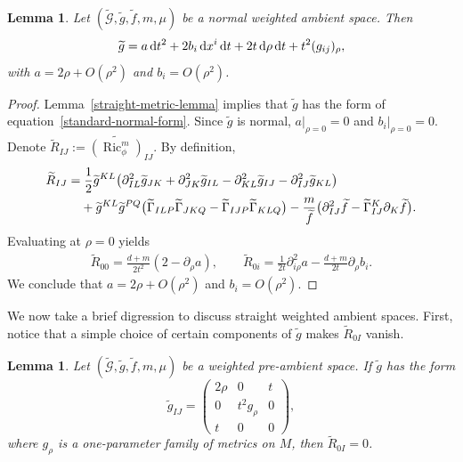 \documentclass[pdftex]{sigma}
\DeclareMathOperator{\Ric}{Ric}
\newcommand{\ric}{\Ric_{\phi}^m}
\numberwithin{equation}{section}
\newtheorem{Lemma}[Theorem]{Lemma}
\begin{document}
\begin{Lemma}\label{ambient-metric-base-case}
Let $(\widetilde{\mathcal{G}},\widetilde{g},\widetilde{f},m,\mu)$ be a normal weighted ambient space. Then \begin{equation}\label{standard-normal-form}\widetilde{g}=a\,\mathrm{d}t^2+2b_i\, {\rm d}x^i \,\mathrm{d}t+ 2t\,{\rm d}\rho\, \mathrm{d}t+ t^2 (g_{ij})_\rho,\end{equation} with $a=2\rho+O(\rho^2)$ and $b_i=O(\rho^2)$.
\end{Lemma}

\begin{proof}
Lemma~\ref{straight-metric-lemma} implies that $\widetilde{g}$ has the form of equation~\eqref{standard-normal-form}. Since $\widetilde{g}$ is normal, $a|_{\rho=0}=0$ and $b_i|_{\rho=0}=0$. Denote $\widetilde{R}_{IJ}:=\widetilde{(\ric)}_{IJ}$.
By definition,
\begin{gather*}
\begin{split}
&\widetilde{R}_{IJ}=\frac{1}{2}\widetilde{g}^{KL}\big(\partial^2_{IL}\widetilde{g}_{JK} +\partial^2_{JK}\widetilde{g}_{IL}-\partial^2_{KL}\widetilde{g}_{IJ}-\partial^2_{IJ}\widetilde{g}_{KL}\big)
\\ &\hphantom{\widetilde{R}_{IJ}=}
{}+\widetilde{g}^{KL}\widetilde{g}^{PQ}\big(\widetilde{\Gamma}_{ILP}\widetilde{\Gamma}_{JKQ} -\widetilde{\Gamma}_{IJP}\widetilde{\Gamma}_{KLQ}\big)
-\frac{m}{\widetilde{f}}\big(\partial^2_{IJ}\widetilde{f} -\widetilde{\Gamma}^K_{IJ}\partial_K\widetilde{f}\big).
\end{split}
\end{gather*}
Evaluating at $\rho=0$ yields
\begin{gather*}
\widetilde{R}_{00}= \frac{d+m}{2t^2}(2-\partial_{\rho}a),
\qquad
\widetilde{R}_{0i}=\frac{1}{2t}\partial^2_{i\rho}a -\frac{d+m}{2t}\partial_{\rho}b_i.
\end{gather*}
We conclude that $a=2\rho+O(\rho^2)$ and $b_i=O(\rho^2)$.
\end{proof}

We now take a brief digression to discuss straight weighted ambient spaces. First, notice that a simple choice of certain components of $\widetilde{g}$ makes $\widetilde{R}_{0I}$ vanish.

\begin{Lemma}
\label{straight-zero-theorem}
Let $(\widetilde{\mathcal{G}},\widetilde{g},\widetilde{f},m,\mu)$ be a weighted pre-ambient space. If $\widetilde{g}$ has the form
\begin{equation}
\label{straightmetric}
 \widetilde{g}_{IJ}=\begin{pmatrix} 2\rho&0&t\\0& t^2 g_{\rho}&0\\t&0&0 \end{pmatrix}\!,
\end{equation}
where $g_\rho$ is a one-parameter family of metrics on $M$, then $\widetilde{R}_{0I}=0$.
\end{Lemma}
\end{document}
